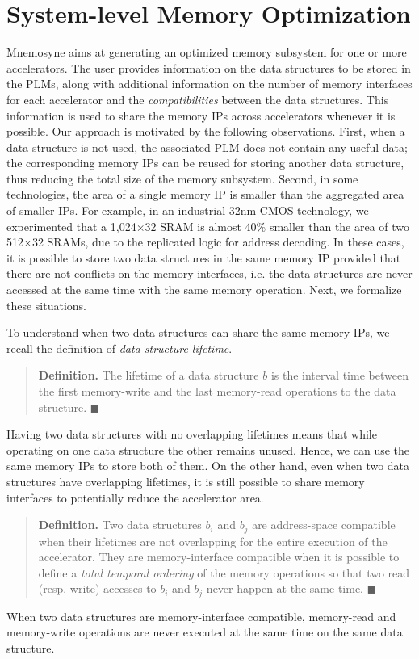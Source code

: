 \section{System-level Memory Optimization}
{\sc Mnemosyne} aims at generating an optimized memory subsystem for
one or more accelerators. The user provides information on the
data structures to be stored in the PLMs, along with additional
information on the number of memory interfaces for each accelerator
and the \textit{compatibilities} between the data structures. This
information is used to share the memory IPs across accelerators
whenever it is possible.
%
Our approach is motivated by the following observations. First, when a data
structure is not used, the associated PLM does not contain any useful data; the
corresponding memory IPs can be reused for storing another data structure, thus
reducing the total size of the memory subsystem.
Second, in some technologies, the area of a single memory IP is smaller
than the aggregated area of smaller IPs. For example, in an industrial 32nm CMOS
technology, we experimented that a 1,024$\times$32 SRAM is almost 40\%
smaller than the area of two 512$\times$32 SRAMs, due to the replicated logic
for address decoding. In these cases, it is possible to store two data
structures in the same memory IP provided that there are not conflicts on the
memory interfaces, i.e. the data structures are never accessed at the same time
with the same memory operation. Next, we formalize these situations.

To understand when two data structures can share the same memory IPs, we recall
the definition of \textit{data structure lifetime}.
\begin{quote}
{
\small
{\bf Definition.} 
The lifetime of a data structure $b$ is the interval time between the first
memory-write and the last memory-read operations to the data
structure.
\hfill $\blacksquare$
}
\end{quote}
Having two data structures with no overlapping lifetimes means that
while operating on one data structure the other remains unused.
Hence, we can use the same memory IPs to store both of them.  On the other hand,
even when two data structures have overlapping lifetimes, it is still possible
to share memory interfaces to potentially reduce the accelerator area.
\begin{quote}
{
\small
{\bf Definition.} 
Two data structures $b_i$ and $b_j$ are address-space compatible when
their lifetimes are not overlapping for the entire execution of the
accelerator. They are memory-interface compatible when it is possible
to define a \textit{total temporal ordering} of the memory operations so that
two read (resp. write) accesses to $b_i$ and $b_j$ never happen at the
same time.
\hfill $\blacksquare$
}
\end{quote}
When two data structures are memory-interface compatible, memory-read and
memory-write operations are never executed at the same time on the same data
structure.

